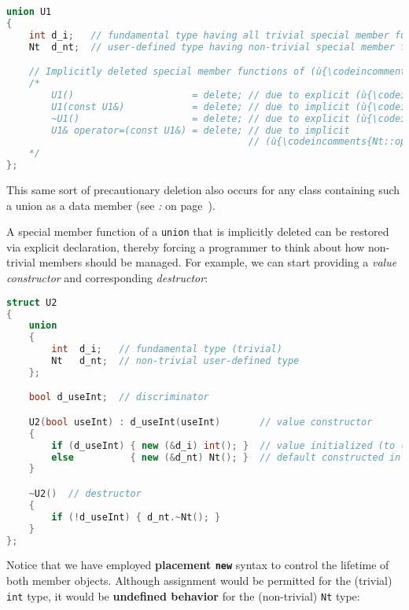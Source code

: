 \begin{lstlisting}[language=C++]
union U1
{
    int d_i;   // fundamental type having all trivial special member functions
    Nt  d_nt;  // user-defined type having non-trivial special member functions

    // Implicitly deleted special member functions of (ù{\codeincomments{U1}}ù):
    /*
        U1()                     = delete; // due to explicit (ù{\codeincomments{Nt::Nt()}}ù)
        U1(const U1&)            = delete; // due to implicit (ù{\codeincomments{Nt::Nt(const Nt\&)}}ù)
        ~U1()                    = delete; // due to explicit (ù{\codeincomments{Nt::}}ù)~(ù{\codeincomments{Nt()}}ù)
        U1& operator=(const U1&) = delete; // due to implicit 
                                           // (ù{\codeincomments{Nt::operator=(const Nt\&)}}ù)
    */
};
\end{lstlisting}
    
\noindent This same sort of precautionary deletion also occurs for any class
containing such a union as a data member (see {\it{}: } on page~\pageref{implementing-a-sum-type-as-a-discriminating-(or-tagged)-union}).

A special member function of a \texttt{union} that is implicitly deleted
can be restored via explicit declaration, thereby forcing a programmer
to think about how non-trivial members should be managed. For example,
we can start providing a \emph{value constructor} and corresponding
\emph{destructor}:

\begin{lstlisting}[language=C++]
struct U2
{
    union
    {
        int  d_i;   // fundamental type (trivial)
        Nt   d_nt;  // non-trivial user-defined type
    };

    bool d_useInt;  // discriminator

    U2(bool useInt) : d_useInt(useInt)       // value constructor
    {
        if (d_useInt) { new (&d_i) int(); }  // value initialized (to (ù{\codeincomments{0}}ù))
        else          { new (&d_nt) Nt(); }  // default constructed in place
    }

    ~U2()  // destructor
    {
        if (!d_useInt) { d_nt.~Nt(); }
    }
};
\end{lstlisting}
    
\noindent Notice that we have employed \textbf{placement \texttt{new}} syntax to
control the lifetime of both member objects. Although assignment would
be permitted for the (trivial) \texttt{int} type, it would be
\textbf{undefined behavior} for the (non-trivial) \texttt{Nt} type:

